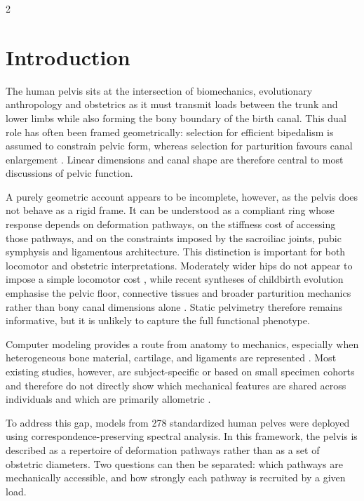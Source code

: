 \documentclass[openacc]{rsproca_new}
\begin{document}
\maketitle

\begin{multicols}{2}

\section{Introduction}

The human pelvis sits at the intersection of biomechanics, evolutionary anthropology and obstetrics as it must transmit loads between the trunk and lower limbs while also forming the bony boundary of the birth canal. This dual role has often been framed geometrically: selection for efficient bipedalism is assumed to constrain pelvic form, whereas selection for parturition favours canal enlargement \cite{RosenbergTrevathan2002,Trevathan2015,Grunstra2023}. Linear dimensions and canal shape are therefore central to most discussions of pelvic function.

A purely geometric account appears to be incomplete, however, as the pelvis does not behave as a rigid frame. It can be understood as a compliant ring whose response depends on deformation pathways, on the stiffness cost of accessing those pathways, and on the constraints imposed by the sacroiliac joints, pubic symphysis and ligamentous architecture. This distinction is important for both locomotor and obstetric interpretations. Moderately wider hips do not appear to impose a simple locomotor cost \cite{Warrener2015}, while recent syntheses of childbirth evolution emphasise the pelvic floor, connective tissues and broader parturition mechanics rather than bony canal dimensions alone \cite{Pavlicev2020,Haeusler2021,Grunstra2023}. Static pelvimetry therefore remains informative, but it is unlikely to capture the full functional phenotype.

Computer modeling provides a route from anatomy to mechanics, especially when heterogeneous bone material, cartilage, and ligaments are represented \cite{Eichenseer2011,Hammer2013,Salo2017,Ramezani2019,HammerKlima2019,Ricci2020,Henys2022}. Most existing studies, however, are subject-specific or based on small specimen cohorts and therefore do not directly show which mechanical features are shared across individuals and which are primarily allometric \cite{HammerKlima2019,Salo2017,Ramezani2019,DubeCyr2021}.

To address this gap, models from 278 standardized human pelves were deployed using correspondence-preserving spectral analysis. In this framework, the pelvis is described as a repertoire of deformation pathways rather than as a set of obstetric diameters. Two questions can then be separated: which pathways are mechanically accessible, and how strongly each pathway is recruited by a given load.


\end{multicols}
\end{document}
